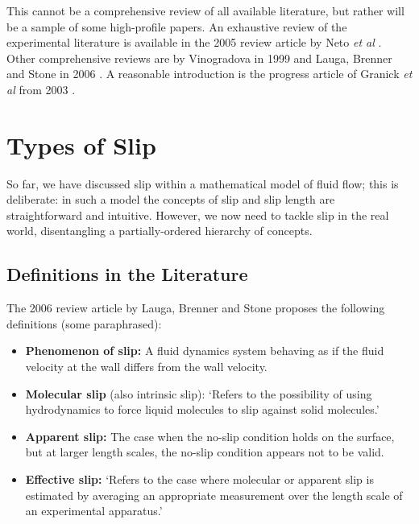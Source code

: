 \documentclass[12pt, a4paper, twoside, openright]{book}
\begin{document}
This cannot be a comprehensive review of all available literature, but rather will be a sample of some high-profile papers.
An exhaustive review of the experimental literature is available in the 2005 review article by Neto \emph{et al} \cite{NetoReview2005}. Other comprehensive reviews are by Vinogradova in 1999 \cite{VinogradovaReview1999} and Lauga, Brenner and Stone in 2006 \cite{LaugaReview2006}. A reasonable introduction is the progress article of Granick \emph{et al} from 2003 \cite{GranickReview2003}.

\section*{Types of Slip}

So far, we have discussed slip within a mathematical model of fluid flow; this is deliberate: in such a model the concepts of slip and slip length are straightforward and intuitive. However, we now need to tackle slip in the real world, disentangling a partially-ordered hierarchy of concepts.

\clearpage
\subsection*{Definitions in the Literature}

The 2006 review article by Lauga, Brenner and Stone \cite{LaugaReview2006} proposes the following definitions (some paraphrased):

\begin{itemize}

\item \textbf{Phenomenon of slip:} A fluid dynamics system behaving as if the fluid velocity at the wall differs from the wall velocity.

\item \textbf{Molecular slip} (also intrinsic slip): `Refers to the possibility of using hydrodynamics to force liquid molecules to slip against solid molecules.'

\item \textbf{Apparent slip:} The case when the no-slip condition holds on the surface, but at larger length scales, the no-slip condition appears not to be valid.

\item \textbf{Effective slip:} `Refers to the case where molecular or apparent slip is estimated by averaging an appropriate measurement over the length scale of an experimental apparatus.'

\end{itemize}
\end{document}
